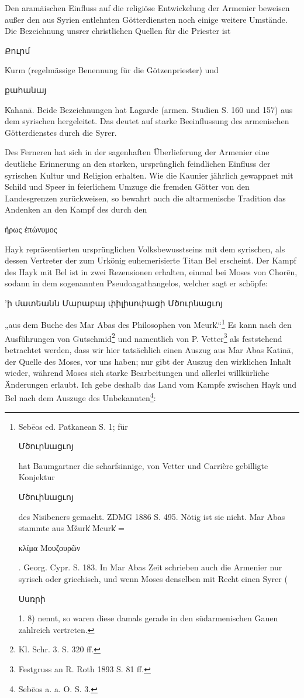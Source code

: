 \documentclass{article}
\begin{document}
Den aramäischen Einfluss auf die religiöse Entwickelung der Armenier beweisen außer den aus Syrien entlehnten Götterdiensten noch einige weitere Umstände. Die Bezeichnung unsrer christlichen Quellen für die Priester ist \begin{armenian}Քուրմ\end{armenian} K͑urm (regelmässige Benennung für die Götzenpriester) und \begin{armenian}քահանայ\end{armenian} K͑ahanā. Beide Bezeichnungen hat Lagarde (armen. Studien S. 160 und 157) aus dem syrischen hergeleitet. Das deutet auf starke Beeinflussung des armenischen Götterdienstes durch die Syrer.

Des Ferneren hat sich in der sagenhaften Überlieferung der Armenier eine deutliche Erinnerung an den starken, ursprünglich feindlichen Einfluss der syrischen Kultur und Religion erhalten. Wie die Kaunier jährlich gewappnet mit Schild und Speer in feierlichem Umzuge die fremden Götter von den Landesgrenzen zurückweisen, so bewahrt auch die altarmenische Tradition das Andenken an den Kampf des durch den \begin{greek}ἥρως ἐπώνυμος\end{greek} Hayk repräsentierten ursprünglichen Volksbewusstseins mit dem syrischen, als dessen Vertreter der zum Urkönig euhemerisierte Titan Bel erscheint. Der Kampf des Hayk mit Bel ist in zwei Rezensionen erhalten, einmal bei Moses von Chorēn, sodann in dem sogenannten Pseudoagathangelos, welcher sagt er schöpfe: \begin{armenian}'ի մատեանն Մարաբայ փիլիսոփացի Մծուրնացւոյ\end{armenian} „aus dem Buche des Mar Abas des Philosophen von Mcurk͑.“\footnote{Sebēos ed. Patkanean S. 1; für \begin{armenian}Մծուրնացւոյ\end{armenian} hat Baumgartner die scharfsinnige, von Vetter und Carrière gebilligte Konjektur \begin{armenian}Մծուինացւոյ\end{armenian} des Nisibeners gemacht. ZDMG 1886 S. 495. Nötig ist sie nicht. Mar Abas stammte aus Mžurk͑ Mcurk͑ = \begin{greek}κλίμα Μουζουρῶν\end{greek}. Georg. Cypr. S. 183. In Mar Abas Zeit schrieben auch die Armenier nur syrisch oder griechisch, und wenn Moses denselben mit Recht einen Syrer (\begin{armenian}Սսռրի\end{armenian} 1. 8) nennt, so waren diese damals gerade in den südarmenischen Gauen zahlreich vertreten.} Es kann nach den Ausführungen von Gutschmid\footnote{Kl. Schr. 3. S. 320 ff.} und namentlich von P. Vetter\footnote{Festgruss an R. Roth 1893 S. 81 ff.} als feststehend betrachtet werden, dass wir hier tatsächlich einen Auszug aus Mar Abas Katinā, der Quelle des Moses, vor uns haben; nur gibt der Auszug den wirklichen Inhalt wieder, während Moses sich starke Bearbeitungen und allerlei willkürliche Änderungen erlaubt. Ich gebe deshalb das Land vom Kampfe zwischen Hayk und Bel nach dem Auszuge des Unbekannten\footnote{Sebēos a. a. O. S. 3.}:
\end{document}
